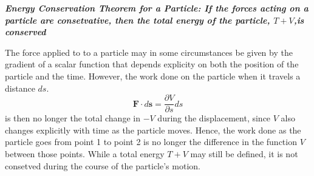 \textbf{\textit{Energy Conservation Theorem for a Particle: If the forces acting on a particle are consetvative, then the total energy of the particle, $T+V$,is conserved}}\\
\begin{note}
	The force applied to to a particle may in some circumstances be given by the gradient of a scalar function that depends explicity on both the position of the particle and the time. However, the work done on the particle when it travels a distance $ds$.
	$$\textbf{F}\cdot{d\textbf{s}=\frac{\partial V}{\partial s}ds}$$
	is then no longer the total change in $-V$ during the displacement, since $V$ also changes explicitly with time as the particle moves. Hence, the work done as the particle goes from point 1 to point 2 is no longer the difference in the function $V$ between those points. While a total  energy $T+V$ may still be defined, it is not consetved during the course of the particle's motion.
\end{note}
